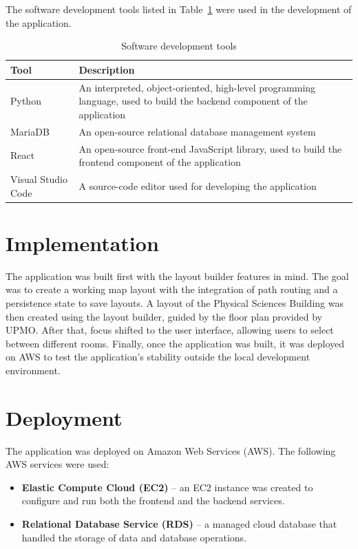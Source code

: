 The software development tools listed in Table~\ref{tab:3.2} were used in the
development of the application.

\begin{table}[htbp]
\centering
\singlespacing
\caption{Software development tools}\label{tab:3.2}
\renewcommand{\arraystretch}{1.15}
\begin{tabularx}{\linewidth}{lX}
\toprule
\textbf{Tool} & \textbf{Description} \\
\midrule
Python & An interpreted, object-oriented, high-level programming language, used to build the backend component of the application \\
MariaDB & An open-source relational database management system \\
React & An open-source front-end JavaScript library, used to build the frontend component of the application \\
Visual Studio Code & A source-code editor used for developing the application \\
\bottomrule
\end{tabularx}
\end{table}

\section{Implementation}\label{sec:3.4}

The application was built first with the layout builder features in mind. The
goal was to create a working map layout with the integration of path routing and
a persistence state to save layouts. A layout of the Physical Sciences Building
was then created using the layout builder, guided by the floor plan provided by
UPMO. After that, focus shifted to the user interface, allowing users to select
between different rooms. Finally, once the application was built, it was
deployed on AWS to test the application's stability outside the local
development environment.

\section{Deployment}\label{sec:3.5}

The application was deployed on Amazon Web Services (AWS). The following AWS
services were used:

\begin{itemize}
\item
  \textbf{Elastic Compute Cloud (EC2)} -- an EC2 instance was created to
  configure and run both the frontend and the backend services.
\item
  \textbf{Relational Database Service (RDS)} -- a managed cloud database that
  handled the storage of data and database operations.
\end{itemize}

